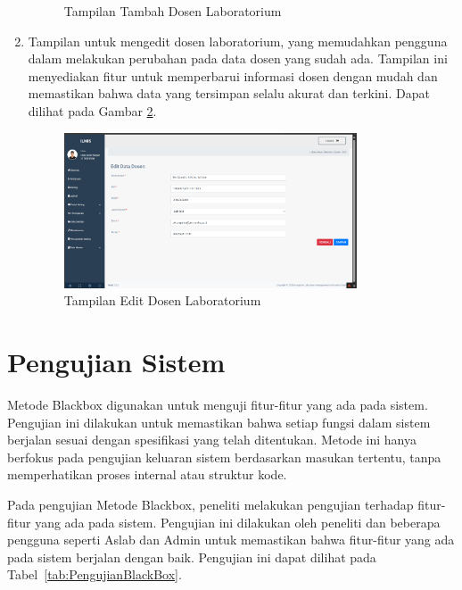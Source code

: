 \begin{enumerate}
\begin{figure}
		      \caption{Tampilan Tambah Dosen Laboratorium}
		      \label{fig:tambah-dosen}
	      \end{figure}
	\item Tampilan untuk mengedit dosen laboratorium, yang memudahkan pengguna dalam melakukan perubahan pada data dosen yang sudah ada. Tampilan ini menyediakan fitur untuk memperbarui informasi dosen dengan mudah dan memastikan bahwa data yang tersimpan selalu akurat dan terkini. Dapat dilihat pada Gambar \ref{fig:edit-dosen}.
	      \begin{figure}
		      \centering
		      \includegraphics[width=0.82\textwidth]{konten/gambar/hasil/edit-dosen.png}
		      \caption{Tampilan Edit Dosen Laboratorium}
		      \label{fig:edit-dosen}
	      \end{figure}
\end{enumerate}

\section{Pengujian Sistem}
Metode Blackbox digunakan untuk menguji fitur-fitur yang ada pada sistem. Pengujian ini dilakukan untuk memastikan bahwa setiap fungsi dalam sistem berjalan sesuai dengan spesifikasi yang telah ditentukan. Metode ini hanya berfokus pada pengujian keluaran sistem berdasarkan masukan tertentu, tanpa memperhatikan proses internal atau struktur kode.

Pada pengujian Metode Blackbox, peneliti melakukan pengujian terhadap fitur-fitur yang ada pada sistem. Pengujian ini dilakukan oleh peneliti dan beberapa pengguna seperti Aslab dan Admin untuk memastikan bahwa fitur-fitur yang ada pada sistem berjalan dengan baik. Pengujian ini dapat dilihat pada Tabel~\ref{tab:PengujianBlackBox}.


